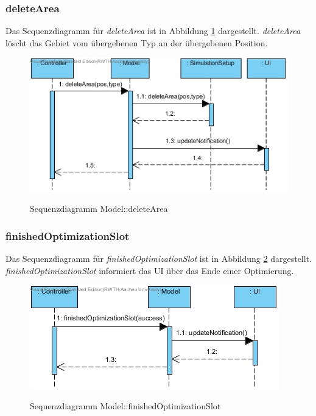 \subsubsection*{deleteArea}

Das Sequenzdiagramm für \emph{deleteArea} ist in Abbildung \ref{Sequenzdiagramm Model::deleteArea} dargestellt. \emph{deleteArea} löscht das Gebiet vom übergebenen Typ an der übergebenen Position.

\begin{figure}[H]
	\centering
	\includegraphics[scale=.85]{Bilder/Model__deleteArea().jpg}\\
	\caption{Sequenzdiagramm Model::deleteArea}
	\label{Sequenzdiagramm Model::deleteArea}
\end{figure}

\subsubsection*{finishedOptimizationSlot}

Das Sequenzdiagramm für \emph{finishedOptimizationSlot} ist in Abbildung \ref{Sequenzdiagramm Model::finishedOptimizationSlot} dargestellt. \emph{finishedOptimizationSlot} informiert das UI über das Ende einer Optimierung.

\begin{figure}[H]
	\centering
	\includegraphics[scale=.85]{Bilder/Model__finishedOptimizationSlot().jpg}\\
	\caption{Sequenzdiagramm Model::finishedOptimizationSlot}
	\label{Sequenzdiagramm Model::finishedOptimizationSlot}
\end{figure}

